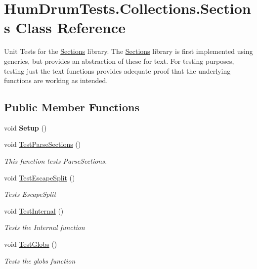 \hypertarget{classHumDrumTests_1_1Collections_1_1Sections}{}\section{Hum\+Drum\+Tests.\+Collections.\+Sections Class Reference}
\label{classHumDrumTests_1_1Collections_1_1Sections}


Unit Tests for the \hyperlink{classHumDrumTests_1_1Collections_1_1Sections}{Sections} library. The \hyperlink{classHumDrumTests_1_1Collections_1_1Sections}{Sections} library is first implemented using generics, but provides an abstraction of these for text. For testing purposes, testing just the text functions provides adequate proof that the underlying functions are working as intended.  


\subsection*{Public Member Functions}
\begin{DoxyCompactItemize}
\item 
void {\bfseries Setup} ()\hypertarget{classHumDrumTests_1_1Collections_1_1Sections_afac2da0762d02ff32dc3e97d479d995f}{}\label{classHumDrumTests_1_1Collections_1_1Sections_afac2da0762d02ff32dc3e97d479d995f}

\item 
void \hyperlink{classHumDrumTests_1_1Collections_1_1Sections_a0b572152156a1729cd41bc1e974f9af6}{Test\+Parse\+Sections} ()
\begin{DoxyCompactList}\small\item\em This function tests Parse\+Sections. \end{DoxyCompactList}\item 
void \hyperlink{classHumDrumTests_1_1Collections_1_1Sections_a5b6c58c513742ea5edbb4b64e1a4a92b}{Test\+Escape\+Split} ()
\begin{DoxyCompactList}\small\item\em Tests Escape\+Split \end{DoxyCompactList}\item 
void \hyperlink{classHumDrumTests_1_1Collections_1_1Sections_a4bb5d3ebc8a990cce9d1e9b34e7d65a0}{Test\+Internal} ()
\begin{DoxyCompactList}\small\item\em Tests the Internal function \end{DoxyCompactList}\item 
void \hyperlink{classHumDrumTests_1_1Collections_1_1Sections_a07bf3890ae5c723ca7cf9b73ce5eb1a7}{Test\+Globs} ()
\begin{DoxyCompactList}\small\item\em Tests the globs function \end{DoxyCompactList}\end{DoxyCompactItemize}


